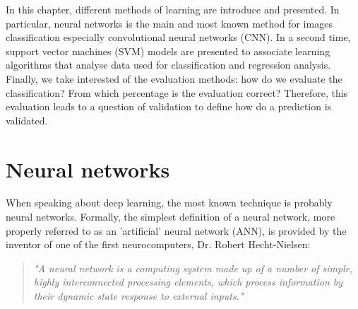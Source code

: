 \documentclass[11pt, openany]{report}
\theoremstyle{plain}
\theoremstyle{definition}
\theoremstyle{remark}
\begin{document}

In this chapter, different methods of learning are introduce and presented. In particular, neural networks is the main and most known method for images classification especially convolutional neural networks (CNN). In a second time, support vector machines (SVM) models are presented to associate learning algorithms that analyse data used for classification and regression analysis. Finally, we take interested of the evaluation methods: how do we evaluate the classification? From which percentage is the evaluation correct? Therefore, this evaluation leads to a question of validation to define how do a prediction is validated.


\section{Neural networks} \label{sec:neural-networks}
When speaking about deep learning, the most known technique is probably neural networks. Formally, the simplest definition of a neural network, more properly referred to as an 'artificial' neural network (ANN), is provided by the inventor of one of the first neurocomputers, Dr. Robert Hecht-Nielsen:  

\begin{quote}
\textit{"A neural network is a computing system made up of a number of simple, highly interconnected processing elements, which process information by their dynamic state response to external inputs."}
\end{quote}    
\end{document}
